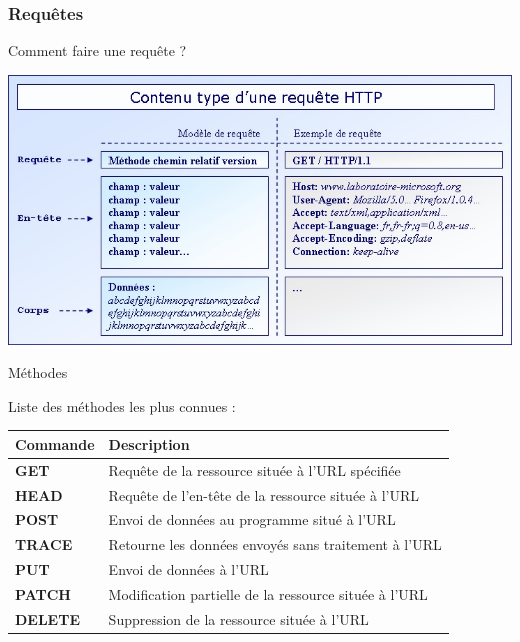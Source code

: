 \subsubsection{Requêtes}


\begin{frame}{Comment faire une requête ?}
	
\includegraphics[scale=0.6]{img_http/requete.jpg}

\end{frame}


\begin{frame}{Méthodes}

Liste des méthodes les plus connues :

\vspace{2em}

\begin{table}[h]
\begin{tabular}{|l|l|}
\hline
   Commande & Description\\ \hline \hline
   \textbf{GET} & Requête de la ressource située à l'URL spécifiée\\ \hline
   \textbf{HEAD} & Requête de l'en-tête de la ressource située à l'URL\\ \hline
   \textbf{POST} & Envoi de données au programme situé à l'URL\\ \hline
   \textbf{TRACE} & Retourne les données envoyés sans traitement à l'URL\\ \hline
   \textbf{PUT} & Envoi de données à l'URL\\ \hline
   \textbf{PATCH} & Modification partielle de la ressource située à l'URL\\ \hline
   \textbf{DELETE} & Suppression de la ressource située à l'URL\\ \hline
\end{tabular}
\end{table}

\end{frame}


